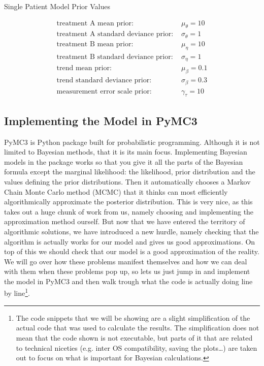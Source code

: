 \documentclass[12pt,a4paper,leqno]{report}
\theoremstyle{plain}
\theoremstyle{definition}
\theoremstyle{remark}
\begin{document}
\begin{table}[H]
    \caption{Single Patient Model Prior Values}\label{singlelpatientmodelpriorvalues}
    \begin{align}\label{}
        \text{treatment A mean prior: } & \mu_{\theta} = 10 \nonumber \\
        \text{treatment A standard deviance prior: } & \sigma_{\theta} = 1 \nonumber \\
        \text{treatment B mean prior: } & \mu_{\eta} = 10 \nonumber \\
        \text{treatment B standard deviance prior: } & \sigma_{\eta} = 1 \nonumber \\
        \text{trend mean prior: } & \mu_{\beta} = 0.1 \nonumber \\
        \text{trend standard deviance prior: } & \sigma_{\beta} = 0.3 \nonumber \\
        \text{measurement error scale prior: } & \gamma_{\tau} = 10 \nonumber
    \end{align}
\end{table}

\subsection{Implementing the Model in PyMC3}

PyMC3 is Python package built for probabilistic programming. Although it is not
limited to Bayesian methods, that it is its main focus. Implementing Bayesian models in
the package works so that you give it all the parts of the Bayesian formula except the
marginal likelihood: the likelihood, prior
distribution and the values defining the prior distributions. Then it automatically
chooses a Markov Chain Monte Carlo method (MCMC) that it thinks can most efficiently
algorithmically approximate the posterior distribution. This is very nice, as this takes out a
huge chunk of work from us, namely choosing and implementing the approximation method
ourself. But now that we have entered the territory of algorithmic solutions, we have
introduced a new hurdle, namely checking that the algorithm is actually works for our
model and gives us good approximations. On top of this we should check that our model is a good
approximation of the reality. We will go over how these problems manifest themselves and
how we can deal with them when these problems pop up, so lets us just jump in and
implement the model in PyMC3 and then walk trough what the code is
actually doing line by line\footnote{The code snippets that we will be showing are a
slight simplification of the actual code that was used to calculate the results. The simplification does not mean
that the code shown is not executable, but parts of it that are related to technical niceties
(e.g. inter OS compatibility, saving the plots\ldots) are taken out to focus on what is
important for Bayesian calculations.}.
\end{document}
